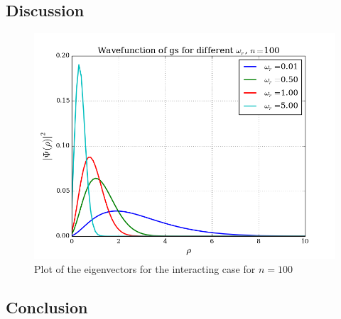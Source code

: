 \documentclass{article}
\begin{document}
\subsection{Discussion}
\begin{figure}[H]
  \centering
  \includegraphics[scale=0.5]{../figures/eigvec_interact_n100.png}
  \caption{Plot of the eigenvectors for the interacting case for $n=100$}
  \label{fig:eigvec100}
\end{figure}
\subsection{Conclusion}

\end{document}
